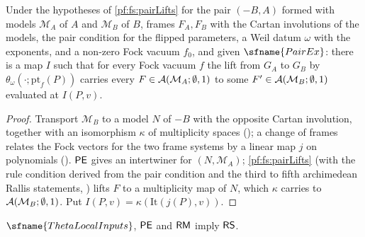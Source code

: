\begin{lemma}\label{pf:fs:liftsneg}
Under the hypotheses of \cref{pf:fs:pairLifts} for the pair $(-B,A)$ formed with models $\mathcal M_A$ of $A$ and $\mathcal M_B$ of $B$,
frames $F_A,F_B$ with the Cartan involutions of the models, the pair condition for the flipped parameters, a Weil datum
$\omega$ with the exponents, and a non-zero Fock vacuum $f_0$, and given $\sfname{PairEx}$: there is a map $I$ such that for every
Fock vacuum $f$ the lift from $G_A$ to $G_B$ by $\theta_\omega(\cdot;\mathrm{pt}_f(P))$ carries every $F\in\mathcal A(\mathcal M_A;\emptyset,1)$
to some $F'\in\mathcal A(\mathcal M_B;\emptyset,1)$ evaluated at $I(P,v)$.
\end{lemma}

\begin{proof}
Transport $\mathcal M_B$ to a model $N$ of $-B$ with the opposite Cartan involution, together with an isomorphism $\kappa$ of
multiplicity spaces (); a change of frames relates the Fock vectors for the two frame systems by a
linear map $j$ on polynomials (). $\mathsf{PE}$ gives an intertwiner for
$(N,\mathcal M_A)$; \cref{pf:fs:pairLifts} (with the rule condition derived from the pair condition and the third to fifth archimedean
Rallis statements, ) lifts $F$ to a multiplicity map of $N$, which $\kappa$
carries to $\mathcal A(\mathcal M_B;\emptyset,1)$. Put $I(P,v)=\kappa(\mathrm{It}(j(P),v))$.
\end{proof}

\begin{proposition}\label{pf:fs:rowstep}
$\sfname{ThetaLocalInputs}$, $\mathsf{PE}$ and $\mathsf{RM}$ imply $\mathsf{RS}$.
\end{proposition}

